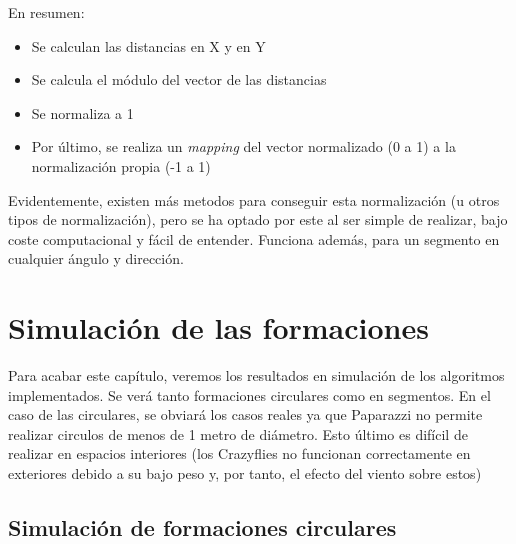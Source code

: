En resumen:

\begin{itemize}
    \item Se calculan las distancias en X y en Y
    \item Se calcula el módulo del vector de las distancias
    \item Se normaliza a 1
    \item Por último, se realiza un \textit{mapping} del vector normalizado (0 a 1) a la normalización propia (-1 a 1)
\end{itemize}

Evidentemente, existen más metodos para conseguir esta normalización (u otros tipos de normalización), 
pero se ha optado por este al ser simple de realizar, bajo coste computacional y fácil de entender. 
Funciona además, para un segmento en cualquier ángulo y dirección.


\section{Simulación de las formaciones}

Para acabar este capítulo, veremos los resultados en simulación de los algoritmos implementados.
Se verá tanto formaciones circulares como en segmentos. 
En el caso de las circulares, se obviará los casos reales ya que Paparazzi 
no permite realizar circulos de menos de 1 metro de diámetro. Esto último es difícil
de realizar en espacios interiores (los Crazyflies no funcionan correctamente en exteriores
debido a su bajo peso y, por tanto, el efecto del viento sobre estos)


\subsection{Simulación de formaciones circulares}

